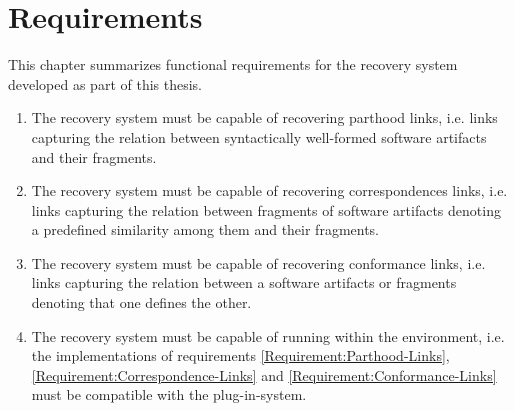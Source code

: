 \chapter{Requirements}
This chapter summarizes functional requirements for the recovery system developed as part of this thesis.

\begin{enumerate}[label=\textbf{R\arabic*},ref=R\arabic*]

\item
\label{Requirement:Parthood-Links}
The recovery system must be capable of recovering parthood links, i.e. links capturing the relation between syntactically well-formed software artifacts and their fragments.

\item
\label{Requirement:Correspondence-Links}
The recovery system must be capable of recovering correspondences links, i.e. links capturing the relation between fragments of software artifacts denoting a predefined similarity among them and their fragments.


\item
\label{Requirement:Conformance-Links} 
The recovery system must be capable of recovering conformance links, i.e. links capturing the relation between a software artifacts or fragments denoting that one defines the other.


\item 
\label{Requirement:Megal-Xtext}
The recovery system must be capable of running within the \megalxtext environment, i.e. the implementations of requirements \ref{Requirement:Parthood-Links}, \ref{Requirement:Correspondence-Links} and \ref{Requirement:Conformance-Links} must be compatible with the \megalxtext plug-in-system.

\end{enumerate}
